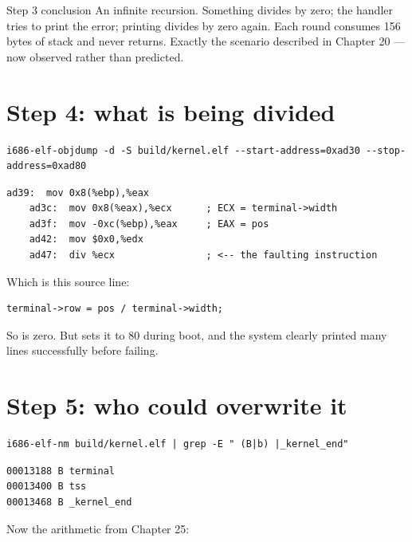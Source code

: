 \begin{concept}{Step 3 conclusion}
An infinite recursion. Something divides by zero; the handler tries to print the error; printing
divides by zero again. Each round consumes 156 bytes of stack and never returns. Exactly the
scenario described in Chapter 20 --- now observed rather than predicted.
\end{concept}

\section{Step 4: what is being divided}

\begin{lstlisting}[style=sh]
i686-elf-objdump -d -S build/kernel.elf --start-address=0xad30 --stop-address=0xad80
\end{lstlisting}

\begin{lstlisting}[style=txt]
    ad39:  mov 0x8(%ebp),%eax
    ad3c:  mov 0x8(%eax),%ecx      ; ECX = terminal->width
    ad3f:  mov -0xc(%ebp),%eax     ; EAX = pos
    ad42:  mov $0x0,%edx
    ad47:  div %ecx                ; <-- the faulting instruction
\end{lstlisting}

Which is this source line:

\begin{lstlisting}[style=c]
terminal->row = pos / terminal->width;
\end{lstlisting}

So  is zero. But  sets it to 80 during boot, and the
system clearly printed many lines successfully before failing. 

\section{Step 5: who could overwrite it}

\begin{lstlisting}[style=sh]
i686-elf-nm build/kernel.elf | grep -E " (B|b) |_kernel_end"
\end{lstlisting}

\begin{lstlisting}[style=txt]
00013188 B terminal
00013400 B tss
00013468 B _kernel_end
\end{lstlisting}

Now the arithmetic from Chapter 25:

